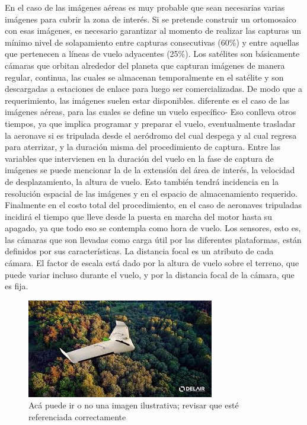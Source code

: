 En el caso de las imágenes aéreas es muy probable que sean necesarias varias imágenes para cubrir la zona de interés. Si se pretende construir un ortomosaico con esas imágenes, es necesario garantizar al momento de realizar las capturas un mínimo nivel de solapamiento entre capturas consecutivas (60\%) y entre aquellas que pertenecen a líneas de vuelo adyacentes (25\%). Los satélites son básicamente cámaras que orbitan alrededor del planeta que capturan imágenes de manera regular, continua, las cuales se  almacenan temporalmente en el satélite y son descargadas a estaciones de enlace para luego ser comercializadas. De modo que a requerimiento, las imágenes suelen estar disponibles. diferente es el caso de las imágenes aéreas, para las cuales se define un vuelo específico- Eso conlleva otros tiempos, ya que implica programar y preparar el vuelo, eventualmente trasladar la aeronave si es tripulada desde el aeródromo del cual despega y al cual regresa para aterrizar, y la duración misma del procedimiento de captura. Entre las variables que intervienen en la duración del vuelo en la fase de captura de imágenes se puede mencionar la de la extensión del área de interés, la velocidad de desplazamiento, la altura de vuelo. Esto también tendrá incidencia en la resolución espacial de las imágenes y en el espacio de almacenamiento requerido. Finalmente en el costo total del procedimiento, en el caso de aeronaves tripuladas incidirá el tiempo que lleve desde la puesta en marcha del motor hasta su apagado, ya que todo eso se contempla como hora de vuelo.
Los sensores, esto es, las cámaras que son llevadas como carga útil por las diferentes plataformas, están definidos por sus características. La distancia focal es un atributo de cada cámara. El factor de escala está dado por la altura de vuelo sobre el terreno, que puede variar incluso durante el vuelo, y por la distancia focal de la cámara, que es fija. 
\begin{figure}
    \includegraphics[width=\textwidth]{Imagenes/dron.jpg}
     \hfill
     \caption{Acá puede ir o no una imagen ilustrativa; revisar que esté referenciada correctamente}
    \label{dron}
\end{figure}


